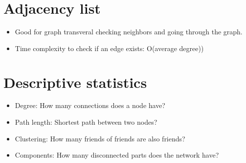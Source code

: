 \section{Adjacency list} 
\begin{itemize}
    \item  Good for graph transveral checking neighbors and going through the graph.
    \item Time complexity to check if an edge exists: O(average degree)) 
\end{itemize}


\section{Descriptive statistics}
\begin{itemize}
    \item Degree: How many connections does a node have?
    \item Path length: Shortest path between two nodes?
    \item Clustering: How many friends of friends are also friends?
    \item Components: How many disconnected parts does the network have? 
\end{itemize}




